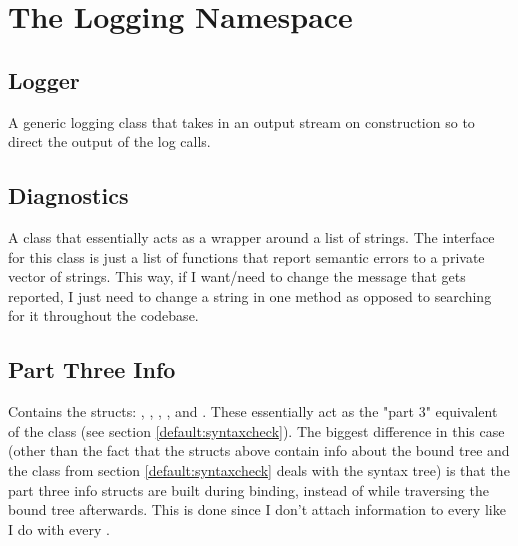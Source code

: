 \documentclass{article}
\begin{document}

\section{The Logging Namespace}
\label{logging:namespace}

\subsection{Logger}
\label{logging:logger}
A generic logging class that takes in an output stream on construction so to direct the output of the log calls.

\subsection{Diagnostics}
\label{logging:diagnostics}
A class that essentially acts as a wrapper around a list of strings.
The interface for this class is just a list of functions that report semantic errors to a private vector of strings.
This way, if I want/need to change the message that gets reported, I just need to change a string in one method as opposed to searching for it throughout the codebase.

\subsection{Part Three Info}
\label{logging:seminfo}
Contains the structs: , , , , and .
These essentially act as the "part 3" equivalent of the  class (see section \ref{default:syntaxcheck}).
The biggest difference in this case (other than the fact that the structs above contain info about the bound tree and the class from section \ref{default:syntaxcheck} deals with the syntax tree) is that the part three info structs are built during binding, instead of while traversing the bound tree afterwards.
This is done since I don't attach  information to every  like I do with every .

\end{document}
